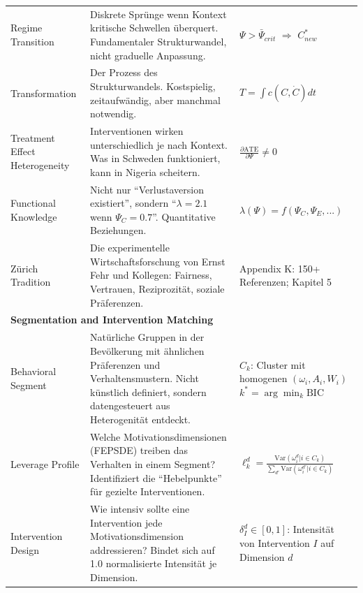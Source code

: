 \begin{center}
\begin{longtable}{@{}p{2.5cm}p{5.2cm}p{5.2cm}@{}}
Regime Transition &
Diskrete Sprünge wenn Kontext kritische Schwellen überquert. Fundamentaler Strukturwandel, nicht graduelle Anpassung. &
$\Psi > \bar{\Psi}_{crit}$ $\Rightarrow$ $C^*_{new}$ \\

Transformation &
Der Prozess des Strukturwandels. Kostspielig, zeitaufwändig, aber manchmal notwendig. &
$T = \int c(C, \dot{C}) dt$ \\

Treatment Effect Heterogeneity &
Interventionen wirken unterschiedlich je nach Kontext. Was in Schweden funktioniert, kann in Nigeria scheitern. &
$\frac{\partial \text{ATE}}{\partial \Psi} \neq 0$ \\

Functional Knowledge &
Nicht nur ``Verlustaversion existiert'', sondern ``$\lambda = 2.1$ wenn $\Psi_C = 0.7$''. Quantitative Beziehungen. &
$\lambda(\Psi) = f(\Psi_C, \Psi_E, ...)$ \\

Zürich Tradition &
Die experimentelle Wirtschaftsforschung von Ernst Fehr und Kollegen: Fairness, Vertrauen, Reziprozität, soziale Präferenzen. &
Appendix K: 150+ Referenzen; \newline Kapitel 5 \\

\midrule
\multicolumn{3}{l}{\cellcolor{orange!10}\textbf{Segmentation and Intervention Matching}} \\
\midrule

Behavioral Segment &
Natürliche Gruppen in der Bevölkerung mit ähnlichen Präferenzen und Verhaltensmustern. Nicht künstlich definiert, sondern datengesteuert aus Heterogenität entdeckt. &
$C_k$: Cluster mit homogenen $(\omega_i, A_i, W_i)$ \newline $k^* = \arg\min_k \text{BIC}$ \\

Leverage Profile &
Welche Motivationsdimensionen (FEPSDE) treiben das Verhalten in einem Segment? Identifiziert die ``Hebelpunkte'' für gezielte Interventionen. &
$\ell_k^d = \frac{\text{Var}(\omega_i^d | i \in C_k)}{\sum_{d'} \text{Var}(\omega_i^{d'} | i \in C_k)}$ \\

Intervention Design &
Wie intensiv sollte eine Intervention jede Motivationsdimension addressieren? Bindet sich auf 1.0 normalisierte Intensität je Dimension. &
$\delta_I^d \in [0,1]$: Intensität von Intervention $I$ auf Dimension $d$ \\


\end{longtable}
\end{center}
